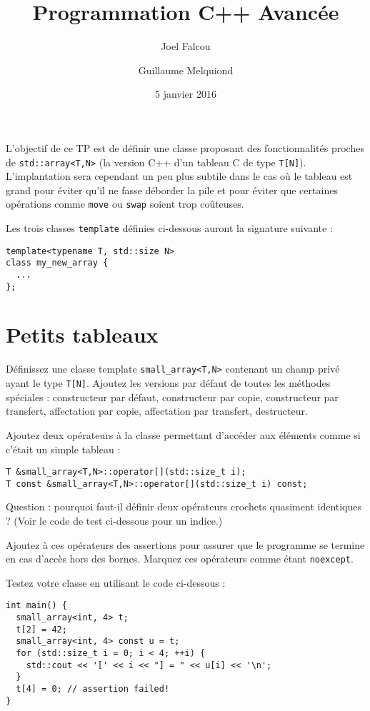 \documentclass[a4paper]{article}
\title{\vspace{-2cm}Programmation C++ Avancée}
\author{Joel Falcou \and Guillaume Melquiond}
\date{5 janvier 2016}
\begin{document}
\maketitle

L'objectif de ce TP est de définir une classe proposant des
fonctionnalités proches de \lstinline|std::array<T,N>| (la version C++
d'un tableau C de type \lstinline|T[N]|). L'implantation sera cependant
un peu plus subtile dans le cas où le tableau est grand pour éviter qu'il
ne fasse déborder la pile et pour éviter que certaines opérations comme
\lstinline|move| ou \lstinline|swap| soient trop coûteuses.

Les trois classes \texttt{template} définies ci-dessous auront la
signature suivante :
\begin{lstlisting}
template<typename T, std::size N>
class my_new_array {
  ...
};
\end{lstlisting}

\section{Petits tableaux}

Définissez une classe template \lstinline|small_array<T,N>| contenant un
champ privé ayant le type \lstinline|T[N]|. Ajoutez les versions par
défaut de toutes les méthodes spéciales : constructeur par défaut,
constructeur par copie, constructeur par transfert, affectation par
copie, affectation par transfert, destructeur.

Ajoutez deux opérateurs à la classe permettant d'accéder aux éléments
comme si c'était un simple tableau :
\begin{lstlisting}
T &small_array<T,N>::operator[](std::size_t i);
T const &small_array<T,N>::operator[](std::size_t i) const;
\end{lstlisting}

Question : pourquoi faut-il définir deux opérateurs crochets quasiment
identiques ? (Voir le code de test ci-dessous pour un indice.)

Ajoutez à ces opérateurs des assertions pour assurer que le programme se
termine en cas d'accès hors des bornes. Marquez ces opérateurs comme
étant \lstinline|noexcept|.

Testez votre classe en utilisant le code ci-dessous :
\begin{lstlisting}
int main() {
  small_array<int, 4> t;
  t[2] = 42;
  small_array<int, 4> const u = t;
  for (std::size_t i = 0; i < 4; ++i) {
    std::cout << '[' << i << "] = " << u[i] << '\n';
  }
  t[4] = 0; // assertion failed!
}
\end{lstlisting}
\end{document}
